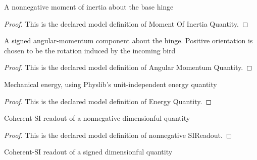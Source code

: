 \begin{definition}
  \label{def:physics:phyx-mini-0790:phyxminiproblems-problemphyxmini0790-momentofinertiaquantity}
  A nonnegative moment of inertia about the base hinge
\end{definition}
\begin{proof}
  This is the declared model definition of Moment Of Inertia Quantity.
\end{proof}
\begin{definition}
  \label{def:physics:phyx-mini-0790:phyxminiproblems-problemphyxmini0790-angularmomentumquantity}
  A signed angular-momentum component about the hinge. Positive orientation is chosen to be the rotation induced by the incoming bird
\end{definition}
\begin{proof}
  This is the declared model definition of Angular Momentum Quantity.
\end{proof}
\begin{definition}
  \label{def:physics:phyx-mini-0790:phyxminiproblems-problemphyxmini0790-energyquantity}
  Mechanical energy, using Physlib's unit-independent energy quantity
\end{definition}
\begin{proof}
  This is the declared model definition of Energy Quantity.
\end{proof}
\begin{definition}
  \label{def:physics:phyx-mini-0790:phyxminiproblems-problemphyxmini0790-nonnegativesireadout}
  Coherent-SI readout of a nonnegative dimensionful quantity
\end{definition}
\begin{proof}
  This is the declared model definition of nonnegative SIReadout.
\end{proof}
\begin{definition}
  \label{def:physics:phyx-mini-0790:phyxminiproblems-problemphyxmini0790-signedsireadout}
  Coherent-SI readout of a signed dimensionful quantity
\end{definition}
